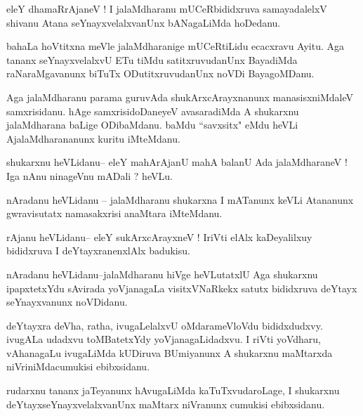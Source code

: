 \documentclass{article}
\begin{document}
\begin{mn}%
eleY dhamaRrAjaneV ! I jalaMdharanu mUCeRbididxruva samayadalelxV shivanu Atana 
seYnayxvelalxvanUnx bANagaLiMda hoDedanu.
\end{mn}

\begin{mn}%
bahaLa hoVtitxna meVle jalaMdharanige mUCeRtiLidu ecacxravu Ayitu. Aga tananx 
seYnayxvelalxvU ETu tiMdu satitxruvudanUnx BayadiMda raNaraMgavanunx biTuTx 
ODutitxruvudanUnx noVDi BayagoMDanu.
\end{mn}

\begin{mn}%
Aga jalaMdharanu parama guruvAda shukArxcArayxnanunx manasisxniMdaleV samxrisidanu. hAge 
samxrisidoDaneyeV avasaradiMda A shukarxnu jalaMdharana baLige ODibaMdanu. baMdu 
``savxsitx" eMdu heVLi AjalaMdharananunx kuritu iMteMdanu.
\end{mn}

\begin{mn}%
shukarxnu heVLidanu-- eleY mahArAjanU mahA balanU Ada jalaMdharaneV ! Iga nAnu ninageVnu 
mADali ? heVLu.
\end{mn}

\begin{mn}%
nAradanu heVLidanu -- jalaMdharanu shukarxna I mATanunx keVLi Atananunx gwravisutatx 
namasakxrisi anaMtara iMteMdanu.
\end{mn}

\begin{mn}%
rAjanu heVLidanu-- eleY sukArxcArayxneV ! IriVti elAlx kaDeyalilxuy bididxruva I 
deYtayxranenxlAlx badukisu.
\end{mn}

\begin{mn}%
nAradanu heVLidanu--jalaMdharanu hiVge heVLutatxlU Aga shukarxnu ipapxtetxYdu sAvirada 
yoVjanagaLa visitxVNaRkekx satutx bididxruva deYtayx seYnayxvanunx noVDidanu.
\end{mn}

\begin{mn}%
deYtayxra deVha, ratha, ivugaLelalxvU oMdarameVloVdu bididxdudxvy. ivugALa udadxvu 
toMBatetxYdy yoVjanagaLidadxvu. I riVti yoVdharu, vAhanagaLu ivugaLiMda kUDiruva BUmiyanunx 
A shukarxnu maMtarxda niVriniMdacumukisi ebibxsidanu.
\end{mn}

\begin{mn}%
rudarxnu tananx jaTeyanunx hAvugaLiMda kaTuTxvudaroLage, I shukarxnu 
deYtayxseYnayxvelalxvanUnx maMtarx niVranunx cumukisi ebibxsidanu.
\end{mn}
\end{document}
